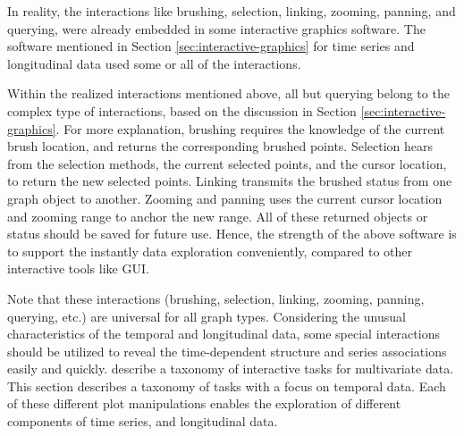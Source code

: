 \documentclass[12pt]{article}
\begin{document}
In reality, the interactions like brushing, selection, linking, zooming,
panning, and querying, were already embedded in some interactive graphics
software. The software mentioned in Section \ref{sec:interactive-graphics}
for time series and longitudinal data
used some or all of the interactions.

Within the realized interactions mentioned above, all but querying
belong to the complex type of interactions, based on the discussion
in Section \ref{sec:interactive-graphics}. For more explanation,
brushing requires the knowledge of the current brush location, and
returns the corresponding brushed points. Selection hears from the
selection methods, the current selected points, and the cursor location,
to return the new selected points. Linking transmits the brushed status
from one graph object to another. Zooming and panning uses the current
cursor location and zooming range to anchor the new range. All of
these returned objects or status should be saved for future use. Hence,
the strength of the above software is to support the instantly data
exploration conveniently, compared to other interactive tools like
GUI. 

Note that these interactions  (brushing, selection, linking, zooming,
panning, querying, etc.) are universal for all graph types. Considering
the unusual characteristics of the temporal and longitudinal data,
some special interactions should be utilized to reveal the time-dependent
structure and series associations easily and quickly.
\citet{Buja1996} describe a taxonomy of interactive tasks
for multivariate data. This section describes a taxonomy
of tasks with a focus on temporal data. Each of these
different plot manipulations enables the exploration of
different components of time series, and longitudinal data.

\end{document}

